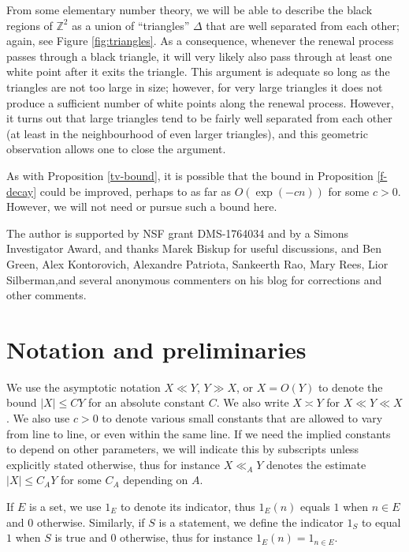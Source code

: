 \documentclass[12pt,a4paper,reqno]{amsart}
\numberwithin{equation}{section}
\theoremstyle{plain}
\theoremstyle{definition}
\newcommand\Z{\mathbb{Z}}
\begin{document}
From some elementary number theory, we will be able to describe the black regions of $\Z^2$ as a union of ``triangles'' $\Delta$ that are well separated from each other; again, see Figure \ref{fig:triangles}.	As a consequence, whenever the renewal process passes through a black triangle, it will very likely also pass through at least one white point after it exits the triangle.  This argument is adequate so long as the triangles are not too large in size; however, for very large triangles it does not produce a sufficient number of white points along the renewal process.  However, it turns out that large triangles tend to be fairly well separated from each other (at least in the neighbourhood of even larger triangles), and this geometric observation allows one to close the argument.

As with Proposition \ref{tv-bound}, it is possible that the bound in Proposition \ref{f-decay} could be improved, perhaps to as far as $O(\exp(-cn))$ for some $c>0$.  However, we will not need or pursue such a bound here.

The author is supported by NSF grant DMS-1764034 and by a Simons Investigator Award, and thanks Marek Biskup for useful discussions, and Ben Green, Alex Kontorovich, Alexandre Patriota, Sankeerth Rao, Mary Rees, Lior Silberman,and several anonymous commenters on his blog for corrections and other comments.


\section{Notation and preliminaries}\label{notation-sec}

We use the asymptotic notation $X \ll Y$, $Y \gg X$, or $X = O(Y)$ to denote the bound $|X| \leq CY$ for an absolute constant $C$. We also write $X \asymp Y$ for $X \ll Y \ll X$.  We also use $c>0$ to denote various small constants that are allowed to vary from line to line, or even within the same line. If we need the implied constants to depend on other parameters, we will indicate this by subscripts unless explicitly stated otherwise, thus for instance $X \ll_A Y$ denotes the estimate $|X| \leq C_A Y$ for some $C_A$ depending on $A$.

If $E$ is a set, we use $1_E$ to denote its indicator, thus $1_E(n)$ equals $1$ when $n \in E$ and $0$ otherwise.  Similarly, if $S$ is a statement, we define the indicator $1_S$ to equal $1$ when $S$ is true and $0$ otherwise, thus for instance $1_E(n) = 1_{n \in E}$.
\end{document}
